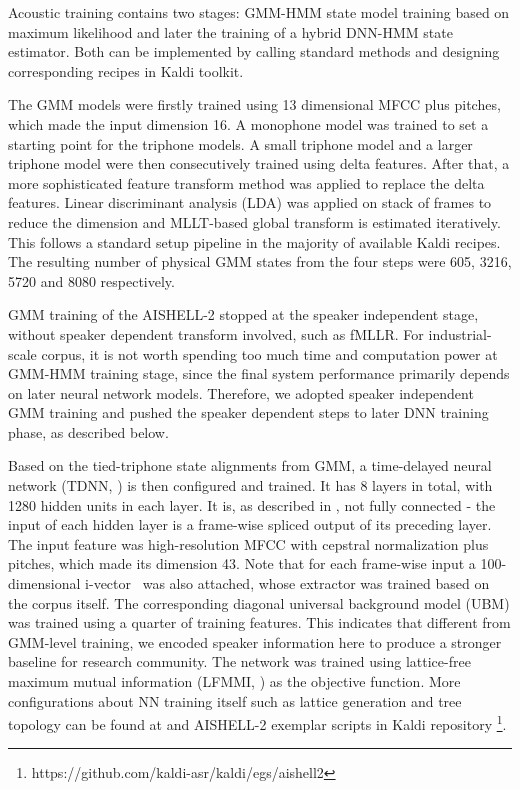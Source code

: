 \documentclass[a4paper]{article}
\begin{document}
Acoustic training contains two stages: GMM-HMM state model training based on maximum likelihood and later the training of a hybrid DNN-HMM state estimator. Both can be implemented by calling standard methods and designing corresponding recipes in Kaldi toolkit.

The GMM models were firstly trained using 13 dimensional MFCC plus pitches, which made the input dimension 16.
A monophone model was trained to set a starting point for the triphone models. A small triphone model and a larger triphone model were then consecutively trained using delta features. After that, a more sophisticated feature transform method was applied to replace the delta features. Linear discriminant analysis (LDA) was applied on stack of frames to reduce the dimension and MLLT-based global transform is estimated iteratively. This follows a standard setup pipeline in the majority of available Kaldi recipes. The resulting number of physical GMM states from the four steps were 605, 3216, 5720 and 8080 respectively.

GMM training of the AISHELL-2 stopped at the speaker independent stage, without speaker dependent transform involved, such as fMLLR. For industrial-scale corpus, it is not worth spending too much time and computation power at GMM-HMM training stage, since the final system performance primarily depends on later neural network models. Therefore, we adopted speaker independent GMM training and pushed the speaker dependent steps to later DNN training phase, as described below.

Based on the tied-triphone state alignments from GMM, a time-delayed neural network (TDNN, \cite{tdnn}) is then configured and trained. It has 8 layers in total, with 1280 hidden units in each layer. It is, as described in \cite{tdnn}, not fully connected - the input of each hidden layer is a frame-wise spliced output of its preceding layer. The input feature was high-resolution MFCC with cepstral normalization plus pitches, which made its dimension 43. Note that for each frame-wise input a 100-dimensional i-vector~\cite{ivector} was also attached, whose extractor was trained based on the corpus itself. The corresponding diagonal universal background model (UBM) was trained using a quarter of training features. This indicates that different from GMM-level training, we encoded speaker information here to produce a stronger baseline for research community. The network was trained using lattice-free maximum mutual information (LFMMI, \cite{lfmmi}) as the objective function. More configurations about NN training itself such as lattice generation and tree topology can be found at \cite{lfmmi} and AISHELL-2 exemplar scripts in Kaldi repository \footnote{https://github.com/kaldi-asr/kaldi/egs/aishell2}.
\end{document}
